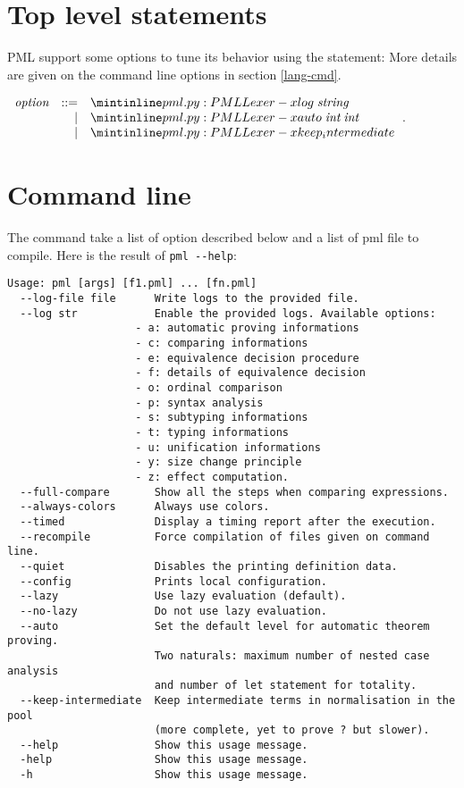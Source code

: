 \section{Top level statements}\label{lang-top}

PML support some options to tune its behavior using the  statement:
  More details are given on the command line options in section \ref{lang-cmd}.

$\begin{array}{lrl}
  \emph{option} &::=& \dupml{log} \; \emph{string} \\
  &\mid& \dupml{auto} \; \emph{int} \; \emph{int}\\
  &\mid& \dupml{keep_intermediate}
\end{array}
$.


\section{Command line}

The command take a list of option described below and a list of pml file to
compile.  Here is the result of \verb!pml --help!:

\begin{verbatim}
Usage: pml [args] [f1.pml] ... [fn.pml]
  --log-file file      Write logs to the provided file.
  --log str            Enable the provided logs. Available options:
                    - a: automatic proving informations
                    - c: comparing informations
                    - e: equivalence decision procedure
                    - f: details of equivalence decision
                    - o: ordinal comparison
                    - p: syntax analysis
                    - s: subtyping informations
                    - t: typing informations
                    - u: unification informations
                    - y: size change principle
                    - z: effect computation.
  --full-compare       Show all the steps when comparing expressions.
  --always-colors      Always use colors.
  --timed              Display a timing report after the execution.
  --recompile          Force compilation of files given on command line.
  --quiet              Disables the printing definition data.
  --config             Prints local configuration.
  --lazy               Use lazy evaluation (default).
  --no-lazy            Do not use lazy evaluation.
  --auto               Set the default level for automatic theorem proving.
                       Two naturals: maximum number of nested case analysis
                       and number of let statement for totality.
  --keep-intermediate  Keep intermediate terms in normalisation in the pool
                       (more complete, yet to prove ? but slower).
  --help               Show this usage message.
  -help                Show this usage message.
  -h                   Show this usage message.
\end{verbatim} 
